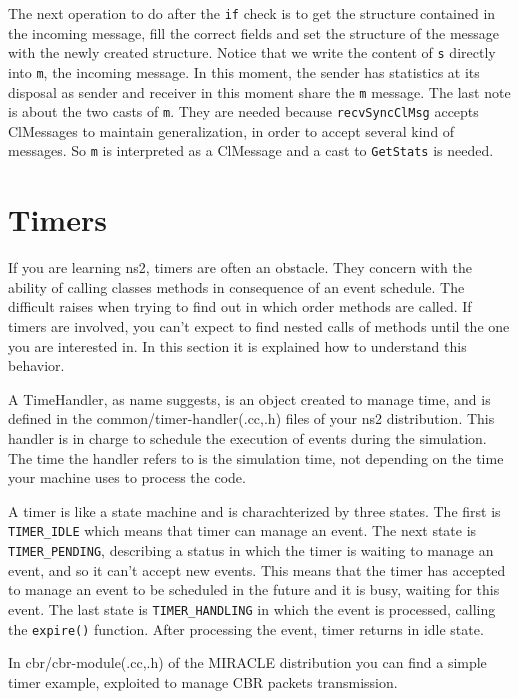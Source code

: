 \documentclass[a4paper,10pt]{article}
\begin{document}
The next operation to do after the \verb=if= check is to get the structure contained in the incoming message, fill the correct fields and set the structure of the message with the newly created structure. Notice that we write the content of \verb=s= directly into \verb=m=, the incoming message. In this moment, the sender has statistics at its disposal as sender and receiver in this moment share the \verb=m= message.
The last note is about the two casts of \verb=m=. They are needed because \verb=recvSyncClMsg= accepts ClMessages to maintain generalization, in order to accept several kind of messages. So \verb=m= is interpreted as a ClMessage and a cast to \verb=GetStats= is needed.

\section{Timers}

If you are learning ns2, timers are often an obstacle. They concern with the ability of calling classes methods in consequence of an event schedule. The difficult raises when trying to find out in which order methods are called. If timers are involved, you can't expect to find nested calls of methods until the one you are interested in. In this section it is explained how to understand this behavior.

A TimeHandler, as name suggests, is an object created to manage time, and is defined in the common/timer-handler(.cc,.h) files of your ns2 distribution. This handler is in charge to schedule the execution of events during the simulation. The time the handler refers to is the simulation time, not depending on the time your machine uses to process the code.

A timer is like a state machine and is charachterized by three states. The first is \verb+TIMER_IDLE+ which means that timer can manage an event. The next state is \verb=TIMER_PENDING=, describing a status in which the timer is waiting to manage an event, and so it can't accept new events. This means that the timer has accepted to manage an event to be scheduled in the future and it is busy, waiting for this event. The last state is \verb=TIMER_HANDLING= in which the event is processed, calling the \verb+expire()+ function. After processing the event, timer returns in idle state.

In cbr/cbr-module(.cc,.h) of the MIRACLE distribution you can find a simple timer example, exploited to manage CBR packets transmission.
\end{document}
